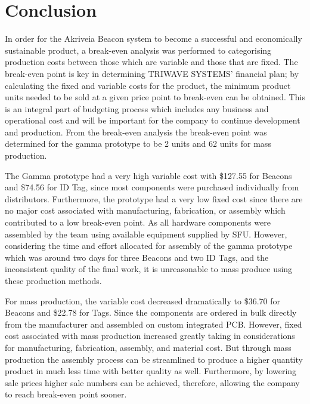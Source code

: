 

\setcounter{section}{2}
\section{Conclusion}

\bigskip
In order for the Akriveia Beacon system to become a successful and economically sustainable product, a break-even analysis was performed to categorising production costs between those which are variable and those that are fixed. The break-even point is key in determining TRIWAVE SYSTEMS’ financial plan; by calculating the fixed and variable costs for the product, the minimum product units needed to be sold at a given price point to break-even can be obtained. This is an integral part of budgeting process which includes any business and operational cost and will be important for the company to continue development and production. From the break-even analysis the break-even point was determined for the gamma prototype to be 2 units and 62 units for mass production. 

\bigskip
The Gamma prototype had a very high variable cost with \$127.55 for Beacons and \$74.56 for ID Tag, since most components were purchased individually from distributors. Furthermore, the prototype had a very low fixed cost since there are no major cost associated with manufacturing, fabrication, or assembly which contributed to a low break-even point. As all hardware components were assembled by the team using available equipment supplied by SFU. However, considering the time and effort allocated for assembly of the gamma prototype which was around two days for three Beacons and two ID Tags, and the inconsistent quality of the final work, it is unreasonable to mass produce using these production methods.

\bigskip
For mass production, the variable cost decreased dramatically to \$36.70 for Beacons and \$22.78 for Tags. Since the components are ordered in bulk directly from the manufacturer and assembled on custom integrated PCB. However, fixed cost associated with mass production increased greatly taking in considerations for manufacturing, fabrication, assembly, and material cost. But through mass production the assembly process can be streamlined to produce a higher quantity product in much less time with better quality as well. Furthermore, by lowering sale prices higher sale numbers can be achieved, therefore, allowing the company to reach break-even point sooner.

